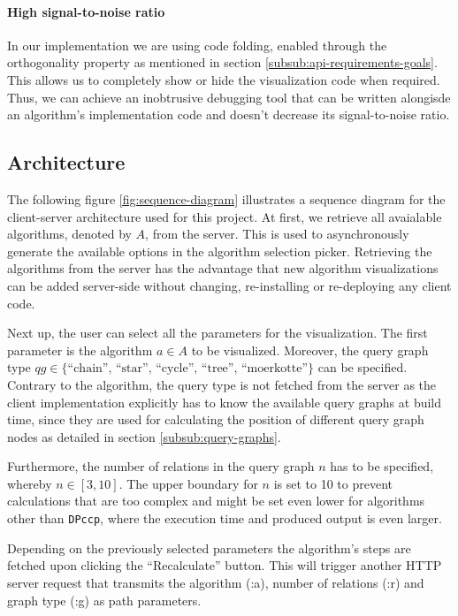 \paragraph{High signal-to-noise ratio} 
In our implementation we are using code folding, enabled
through the orthogonality property as mentioned in 
section \ref{subsub:api-requirements-goals}. This allows
us to completely show or hide the visualization code 
when required. Thus, we can achieve an inobtrusive
debugging tool that can be written alongisde an 
algorithm's implementation code and doesn't decrease
its signal-to-noise ratio.


\subsection{Architecture}

The following figure \ref{fig:sequence-diagram} illustrates a sequence diagram for the client-server architecture used for this project. At first, we retrieve all avaialable algorithms, denoted by $A$, from the server. This is used to asynchronously generate the available options in the algorithm selection picker. Retrieving the algorithms from the server has the advantage that new algorithm visualizations can be added server-side without changing, re-installing or re-deploying any client code.

Next up, the user can select all the parameters for the visualization. The first parameter is the algorithm $a \in A$ to be visualized. Moreover, the query graph type $qg \in {\text{\{``chain'', ``star'', ``cycle'', ``tree'', ``moerkotte''\}}}$ can be specified. Contrary to the algorithm, the query type is not fetched from the server as the client implementation explicitly has to know the available query graphs at build time, since they are used for calculating the position of different query graph nodes as detailed in section \ref{subsub:query-graphs}. 

Furthermore, the number of relations in the query graph $n$ has to be specified, whereby $n \in [3,10]$. The upper boundary for $n$ is set to 10 to prevent calculations that are too complex and might be set even lower for algorithms other than \texttt{DPccp}, where the execution time and produced output is even larger.

Depending on the previously selected parameters the algorithm's steps are fetched upon clicking the ``Recalculate'' button. This will trigger another HTTP server request that transmits the algorithm (:a), number of relations (:r) and graph type (:g) as path parameters.

